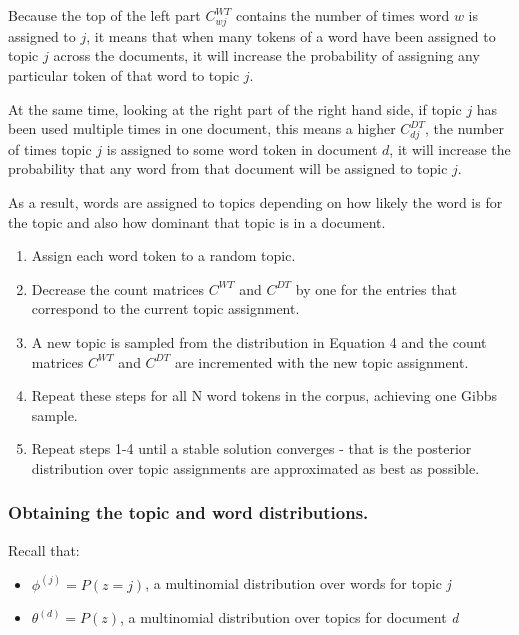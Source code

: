 \documentclass[
]{article}
\providecommand{\tightlist}{%
  \setlength{\itemsep}{0pt}\setlength{\parskip}{0pt}}
\begin{document}
Because the top of the left part \(C^{WT}_{wj}\) contains the number of
times word \(w\) is assigned to \(j\), it means that when many tokens of
a word have been assigned to topic \(j\) across the documents, it will
increase the probability of assigning any particular token of that word
to topic \(j\).

At the same time, looking at the right part of the right hand side, if
topic \(j\) has been used multiple times in one document, this means a
higher \(C^{DT}_{dj}\), the number of times topic \(j\) is assigned to
some word token in document \(d\), it will increase the probability that
any word from that document will be assigned to topic \(j\).

As a result, words are assigned to topics depending on how likely the
word is for the topic and also how dominant that topic is in a document.

\begin{enumerate}
\def\labelenumi{\arabic{enumi}.}
\tightlist
\item
  Assign each word token to a random topic.
\item
  Decrease the count matrices \(C^{WT}\) and \(C^{DT}\) by one for the
  entries that correspond to the current topic assignment.
\item
  A new topic is sampled from the distribution in Equation 4 and the
  count matrices \(C^{WT}\) and \(C^{DT}\) are incremented with the new
  topic assignment.
\item
  Repeat these steps for all N word tokens in the corpus, achieving one
  Gibbs sample.
\item
  Repeat steps 1-4 until a stable solution converges - that is the
  posterior distribution over topic assignments are approximated as best
  as possible.
\end{enumerate}

\hypertarget{obtaining-the-topic-and-word-distributions.}{%
\subsubsection{Obtaining the topic and word
distributions.}\label{obtaining-the-topic-and-word-distributions.}}

Recall that:

\begin{itemize}
\tightlist
\item
  \({\phi}^{(j)} = P(z=j)\), a multinomial distribution over words for
  topic \emph{j}
\item
  \({\theta}^{(d)} = P(z)\), a multinomial distribution over topics for
  document \emph{d}
\end{itemize}
\end{document}
